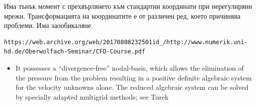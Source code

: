 \documentclass[fleqn,12pt]{article}
\begin{document}
Има тънък момент с прехвърлянето към стандартни координати при нерегулиряни мрежи.
Трансформацията на координатите е от различен ред, което причинява проблеми.
Има заообикаляне.

\begin{verbatim}
https://web.archive.org/web/20170808232501id_/http://www.numerik.uni-hd.de/Oberwolfach-Seminar/CFD-Course.pdf
\end{verbatim}
\begin{itemize}
    \item It possesses a “divergence-free” nodal-basis, which allows the elimination of the pressure from the problem resulting in a positive definite algebraic
system for the velocity unknowns alone. The reduced algebraic system can be
solved by specially adapted multigrid methods; see Turek
\end{itemize}
\end{document}
